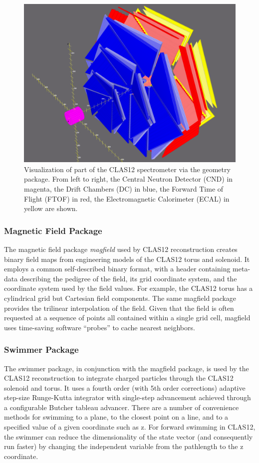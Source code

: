 \begin{figure}
\centering
\includegraphics[width=1.0\columnwidth]{reconstruction/pics/detectorview.png}
\caption{Visualization of part of the CLAS12 spectrometer via the geometry package. From left to right, the Central Neutron Detector (CND) in magenta, the Drift Chambers (DC) in blue, the Forward Time of Flight (FTOF) in red, the Electromagnetic Calorimeter (ECAL) in yellow are shown.}
\label{fig:detectorview}
\end{figure}
\subsubsection{Magnetic Field Package}
The magnetic field package {\it magfield} used by CLAS12 reconstruction creates
binary field maps from engineering models of the CLAS12 torus and solenoid. It employs
a common self-described binary format, with a header containing meta-data describing
the pedigree of the field, its grid coordinate system, and the coordinate system
used by the field values. For example, the CLAS12 torus has a cylindrical grid
but Cartesian field components. The same magfield package provides the trilinear
interpolation of the field. Given that the field is often requested at a sequence
of points all contained within a single grid cell, magfield uses time-saving
software “probes” to cache nearest neighbors.

\subsubsection{Swimmer Package}
The swimmer package, in conjunction with the magfield package, is used by the CLAS12
reconstruction to integrate charged particles through the CLAS12 solenoid and torus.
It uses a fourth order (with 5th order corrections) adaptive step-size Runge-Kutta integrator
with single-step advancement achieved through a configurable Butcher tableau advancer.
There are a number of convenience methods for swimming to a plane, to the closest
point on a line, and to a specified value of a given coordinate such as z. For
forward swimming in CLAS12, the swimmer can reduce the dimensionality of the state
vector (and consequently run faster) by changing the independent variable from
the pathlength to the z coordinate.

